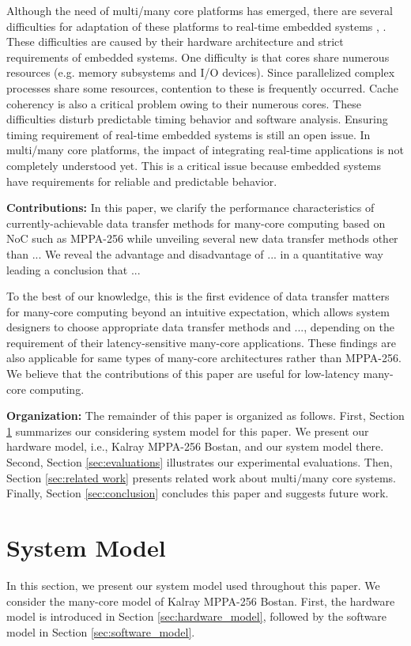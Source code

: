 \documentclass{sig-alternate-05-2015}
\begin{document}
Although the need of multi/many core platforms has emerged, there are several difficulties for adaptation of these platforms to real-time embedded systems \cite{becker2016contention}, \cite{saidi2015shift}.
These difficulties are caused by their hardware architecture and strict requirements of embedded systems.
One difficulty is that cores share numerous resources (e.g. memory subsystems and I/O devices).
Since parallelized complex processes share some resources, contention to these is frequently occurred.
Cache coherency is also a critical problem owing to their numerous cores.
These difficulties disturb predictable timing behavior and software analysis.
Ensuring timing requirement of real-time embedded systems is still an open issue.
In multi/many core platforms, the impact of integrating real-time applications is not completely understood yet.
This is a critical issue because embedded systems have requirements for reliable and predictable behavior.

\textbf{Contributions:}
In this paper, we clarify the performance characteristics of currently-achievable data transfer methods for many-core computing based on NoC such as MPPA-256
while unveiling several new data transfer methods other than ... %
We reveal the advantage and disadvantage of ... in a quantitative way leading a conclusion that ... %

To the best of our knowledge, this is the first evidence of data transfer matters for many-core computing beyond an intuitive expectation,
which allows system designers to choose appropriate data transfer methods and ..., %
depending on the requirement of their latency-sensitive many-core applications.
These findings are also applicable for same types of many-core architectures rather than MPPA-256.
We believe that the contributions of this paper are useful for low-latency many-core computing.

\textbf{Organization:}
The remainder of this paper is organized as follows.
First, Section \ref{sec:system_model} summarizes our considering system model for this paper.
We present our hardware model, i.e., Kalray MPPA-256 Bostan, and our system model there.
Second, Section \ref{sec:evaluations} illustrates our experimental evaluations.
Then, Section \ref{sec:related work} presents related work about multi/many core systems.
Finally, Section \ref{sec:conclusion} concludes this paper and suggests future work.


\section{System Model}
\label{sec:system_model}
In this section, we present our system model used throughout this paper.
We consider the many-core model of Kalray MPPA-256 Bostan.
First, the hardware model is introduced in Section \ref{sec:hardware_model},
followed by the software model in Section \ref{sec:software_model}.
\end{document}
